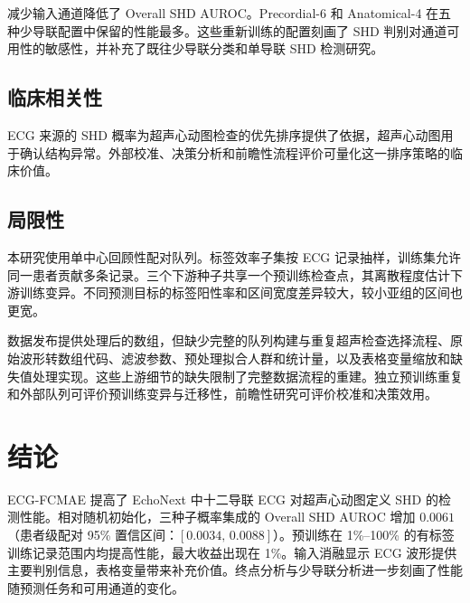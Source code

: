 减少输入通道降低了 Overall SHD AUROC。Precordial-6 和 Anatomical-4 在五种少导联配置中保留的性能最多。这些重新训练的配置刻画了 SHD 判别对通道可用性的敏感性，并补充了既往少导联分类和单导联 SHD 检测研究\cite{le_lightx3ecg_2023,aminorroaya_adapt_shd_2025}。

\subsection{临床相关性}
\label{sec:discussion_clinical}

ECG 来源的 SHD 概率为超声心动图检查的优先排序提供了依据，超声心动图用于确认结构异常。外部校准、决策分析和前瞻性流程评价可量化这一排序策略的临床价值。

\subsection{局限性}
\label{sec:limitations}

本研究使用单中心回顾性配对队列。标签效率子集按 ECG 记录抽样，训练集允许同一患者贡献多条记录。三个下游种子共享一个预训练检查点，其离散程度估计下游训练变异。不同预测目标的标签阳性率和区间宽度差异较大，较小亚组的区间也更宽。

数据发布提供处理后的数组，但缺少完整的队列构建与重复超声检查选择流程、原始波形转数组代码、滤波参数、预处理拟合人群和统计量，以及表格变量缩放和缺失值处理实现。这些上游细节的缺失限制了完整数据流程的重建。独立预训练重复和外部队列可评价预训练变异与迁移性，前瞻性研究可评价校准和决策效用。

\FloatBarrier
\section{结论}
\label{sec:conclusion}

ECG-FCMAE 提高了 EchoNext 中十二导联 ECG 对超声心动图定义 SHD 的检测性能。相对随机初始化，三种子概率集成的 Overall SHD AUROC 增加 $0.0061$（患者级配对 95\% 置信区间：$[0.0034,\,0.0088]$）。预训练在 1\%--100\% 的有标签训练记录范围内均提高性能，最大收益出现在 1\%。输入消融显示 ECG 波形提供主要判别信息，表格变量带来补充价值。终点分析与少导联分析进一步刻画了性能随预测任务和可用通道的变化。


